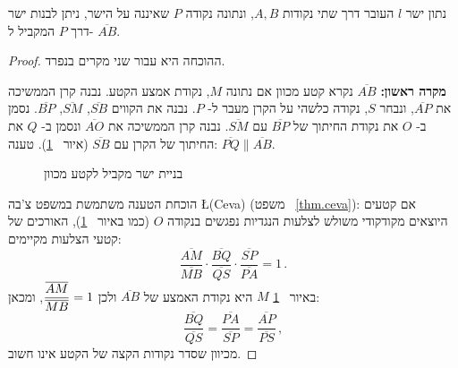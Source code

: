 \begin{theorem}\label{thm.parallel-line}
נתון ישר
$l$
העובר דרך שתי נקודות
$A,B$,
ונתונה נקודה 
$P$
שאיננה על הישר, ניתן לבנות ישר דרך
$P$
המקביל ל-%
$\overline{AB}$.
\end{theorem}
\begin{proof}
ההוכחה היא עבור שני מקרים בנפרד.

\textbf{מקרה ראשון:}
$\overline{AB}$
נקרא קטע מכוון אם נתונה
$M$,
נקודת אמצע הקטע. נבנה קרן הממשיכה את
$\overline{AP}$,
ונבחר
$S$,
נקודה כלשהי על הקרן מעבר ל-%
$P$.
נבנה את הקווים
$\overline{SB}$, $\overline{SM}$, $\overline{BP}$.
נסמן ב-%
$O$
את נקודת החיתוך של 
$\overline{BP}$
עם
$\overline{SM}$.
נבנה קרן הממשיכה את
$\overline{AO}$
ונסמן ב-%
$Q$
את החיתוך של הקרן עם
$\overline{SB}$
(איור%
~\ref{f.se-parallel-directed}).
טענה:
$\overline{PQ}\|\overline{AB}$.

\begin{figure}[tb]
\begin{center}
\caption{בניית ישר מקביל לקטע מכוון}\label{f.se-parallel-directed}
\end{center}
\end{figure}
הוכחת הטענה משתמשת במשפט צ'בה
\L{(Ceva)}
(משפט%
~\ref{thm.ceva}): 
אם קטעים היוצאים מקודקודי משולש לצלעות הנגדיות נפגשים בנקודה
$O$
(כמו באיור%
~\ref{f.se-parallel-directed}),
האורכים של קטעי הצלעות מקיימים:
\[
\frac{\overline{AM}}{\overline{MB}}\cdot\frac{\overline{BQ}}{\overline{QS}}\cdot\frac{\overline{SP}}{\overline{PA}} = 1\,.
\]
באיור%
~\ref{f.se-parallel-directed}
$M$
היא נקודת האמצע של
$\overline{AB}$
ולכן
$\displaystyle\frac{\overline{AM}}{\overline{MB}}=1$,
ומכאן:
\begin{equation}
\frac{\overline{BQ}}{\overline{QS}}=\frac{\overline{PA}}{\overline{SP}}=\frac{\overline{AP}}{\overline{PS}}\,,\label{eq.ceva}
\end{equation}
מכיוון שסדר נקודות הקצה של הקטע אינו חשוב.


\end{proof}
